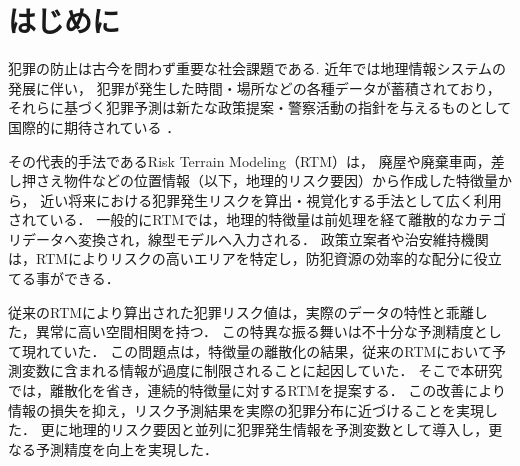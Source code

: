 \maketitle

\section{はじめに}
犯罪の防止は古今を問わず重要な社会課題である.
近年では地理情報システムの発展に伴い，
犯罪が発生した時間・場所などの各種データが蓄積されており\cite{ChicagoDataPortal}，
それらに基づく犯罪予測は新たな政策提案・警察活動の指針を与えるものとして国際的に期待されている
\cite{犯罪予測}．

その代表的手法であるRisk Terrain Modeling（RTM）\cite{caplan2015risk}は，
廃屋や廃棄車両，差し押さえ物件などの位置情報（以下，地理的リスク要因）から作成した特徴量から，
近い将来における犯罪発生リスクを算出・視覚化する手法として広く利用されている\cite{地理的犯罪予測研究の潮流}．
一般的にRTMでは，地理的特徴量は前処理を経て離散的なカテゴリデータへ変換され，線型モデルへ入力される\cite{犯罪予測, caplan2015risk}．
政策立案者や治安維持機関は，RTMによりリスクの高いエリアを特定し，防犯資源の効率的な配分に役立てる事ができる\cite{犯罪予測}．

従来のRTMにより算出された犯罪リスク値は，実際のデータの特性と乖離した，異常に高い空間相関を持つ．
この特異な振る舞いは不十分な予測精度として現れていた．
この問題点は，特徴量の離散化の結果，従来のRTMにおいて予測変数に含まれる情報が過度に制限されることに起因していた．
そこで本研究では，離散化を省き，連続的特徴量に対するRTMを提案する．
この改善により情報の損失を抑え，リスク予測結果を実際の犯罪分布に近づけることを実現した．
更に地理的リスク要因と並列に犯罪発生情報を予測変数として導入し，更なる予測精度を向上を実現した．

